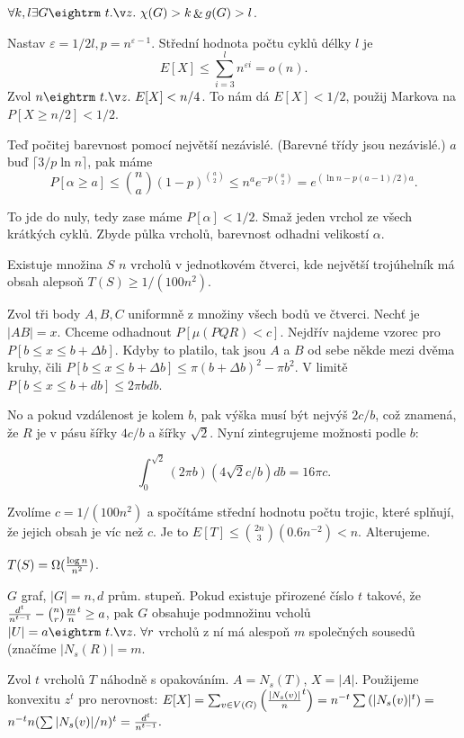  $\forall k,l \exists G \st \chi(G) > k \andamp g(G) > l$.

\prf{} Nastav $\varepsilon = 1/2l, p = n^{\varepsilon-1}$. Střední hodnota počtu cyklů
délky $l$ je $$E[X] \le \sum_{i=3}^l n^{\varepsilon i} = o(n).$$
Zvol $n \st E[X] < n/4$. To nám dá $E[X] < 1/2$, použij Markova na $P[X \ge n/2] < 1/2$.

Teď počitej barevnost pomocí největší nezávislé. (Barevné třídy jsou
nezávislé.) $a$ buď $\lceil 3/p \ln n \rceil$, pak máme
$$P[\alpha \ge a] \le {n \choose a} (1-p)^{{a \choose 2}} \le n^a e^{-p{a \choose 2}} =
e^{(\ln n -p(a-1)/2)a}.$$

To jde do nuly, tedy zase máme $P[\alpha] < 1/2$. Smaž jeden vrchol ze všech
krátkých cyklů.  Zbyde půlka vrcholů, barevnost odhadni velikostí $\alpha$.

\thm{} Existuje množina $S$ $n$ vrcholů v jednotkovém čtverci, kde
největší trojúhelník má obsah alepsoň $T(S) \ge 1/(100n^2)$.

\prf{} Zvol tři body $A,B,C$ uniformně z množiny všech bodů ve
čtverci. Nechť je $|AB| = x$. Chceme odhadnout $P[\mu(PQR) < c]$.
Nejdřív najdeme vzorec pro $P[b \le x \le b + \Delta b]$. Kdyby to
platilo, tak jsou $A$ a $B$ od sebe někde mezi dvěma kruhy, čili $P[b
\le x \le b + \Delta b] \le \pi(b+\Delta b)^2 - \pi b^2$. V limitě
$P[b \le x \le b + db] \le 2\pi b db$.

No a pokud vzdálenost je kolem $b$, pak výška musí být nejvýš $2c/b$,
což znamená, že $R$ je v pásu šířky $4c/b$ a šířky $\sqrt{2}$. Nyní
zintegrujeme možnosti podle $b$:

$$ \int_0^{\sqrt{2}}(2 \pi b)(4 \sqrt{2} c / b) db = 16 \pi c. $$ 

Zvolíme $c = 1/(100n^2)$ a spočítáme střední hodnotu počtu trojic,
které splňují, že jejich obsah je víc než $c$. Je to $E[T] \le {2n
\choose 3}(0.6n^{-2}) < n$. Alterujeme.

 $T(S) = \Omega({\log n \over n^2})$.
 

 $G$ graf, $|G| = n, d$ prům. stupeň. Pokud existuje
přirozené číslo $t$ takové, že ${d^t \over n^{t-1}} - {n \choose r} {m \over
n}^t \ge a$, pak $G$ obsahuje podmnožinu vcholů $|U|=a \st \forall r$ vrcholů z
ní má alespoň $m$ společných sousedů (značíme $|N_s(R)| = m$.

\prf{} Zvol $t$ vrcholů $T$ náhodně s opakováním. $A = N_s(T)$, $X = |A|$. Použijeme
konvexitu $z^t$ pro nerovnost:
$E[X] = \sum_{v \in V(G)} \left({ |N_s(v)| \over n}^t\right) = n^{-t} \sum \left(|N_s(v)|^t\right) =$ $n^{-t} n (\sum |N_s(v)|/n)^t
= {d^t \over n^{t-1}}.$

